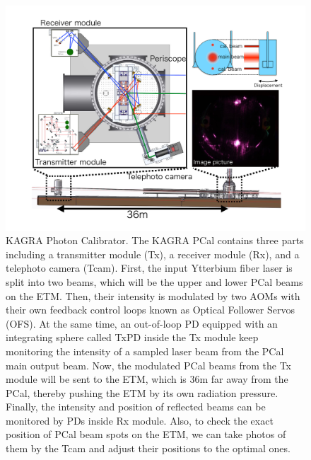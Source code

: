 \begin{figure}[hbt!]
\centering
\includegraphics[width=1\textwidth]{figure/pcal/pcal_drawing.pdf}
\caption[KAGRA Photon Calibrator]{KAGRA Photon Calibrator. The KAGRA PCal contains three parts including a transmitter module (Tx), a receiver module (Rx), and a telephoto camera (Tcam). First, the input Ytterbium fiber laser is split into two beams, which will be the upper and lower PCal beams on the ETM. Then, their intensity is modulated by two AOMs with their own feedback control loops known as Optical Follower Servos (OFS). At the same time, an out-of-loop PD equipped with an integrating sphere called TxPD inside the Tx module keep monitoring the intensity of a sampled laser beam from the PCal main output beam. Now, the modulated PCal beams from the Tx module will be sent to the ETM, which is 36m far away from the PCal, thereby pushing the ETM by its own radiation pressure. Finally, the intensity and position of reflected beams can be monitored by PDs inside Rx module. Also, to check the exact position of PCal beam spots on the ETM, we can take photos of them by the Tcam and adjust their positions to  the optimal ones.}
\label{fig:pcal_drawing}
\end{figure}
 

%

